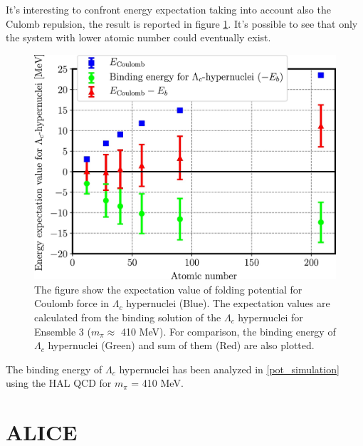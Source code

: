 \documentclass[12pt,a4paper]{book}
\begin{document}
	It's interesting to confront energy expectation taking into account also the Culomb repulsion, the result is reported in figure \ref{fig:binding_culomb}. It's possible to see that only the system with lower atomic number could eventually exist.
	
	\begin{figure}
		\centering
		\includegraphics[width=0.74 \linewidth]{pictures/binding_culomb.jpg}
		\caption{The figure show the expectation value of folding potential for Coulomb force in $\Lambda_c$ hypernuclei (Blue). The expectation values are calculated from the binding solution of the $\Lambda_c$ hypernuclei for Ensemble 3 ($m_\pi \approx$ 410 MeV). For comparison, the binding energy of $\Lambda_c$ hypernuclei (Green) and sum of them (Red) are also plotted.}
		\label{fig:binding_culomb}
	\end{figure}
	
	
	
	
	The binding energy of $\Lambda_c$ hypernuclei has been analyzed in \ref{pot_simulation} using the HAL QCD for $m_\pi$ = 410 MeV. 
	
	\FloatBarrier
	
	
	\chapter{ALICE}
		
\end{document}
